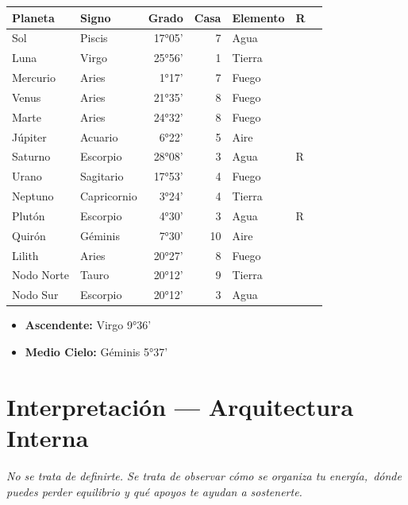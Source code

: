 \documentclass[11pt,a4paper]{article}\usepackage[utf8]{inputenc}
\begin{document}
\begin{center}
\begin{tabular}{llrrlll}
  \toprule
  \textbf{Planeta} & \textbf{Signo} & \textbf{Grado} & \textbf{Casa} &
  \textbf{Elemento} & \textbf{R} \\
  \midrule
  Sol & Piscis & 17°05' & 7 & Agua &  \\
  Luna & Virgo & 25°56' & 1 & Tierra &  \\
  Mercurio & Aries & 1°17' & 7 & Fuego &  \\
  Venus & Aries & 21°35' & 8 & Fuego &  \\
  Marte & Aries & 24°32' & 8 & Fuego &  \\
  Júpiter & Acuario & 6°22' & 5 & Aire &  \\
  Saturno & Escorpio & 28°08' & 3 & Agua & R \\
  Urano & Sagitario & 17°53' & 4 & Fuego &  \\
  Neptuno & Capricornio & 3°24' & 4 & Tierra &  \\
  Plutón & Escorpio & 4°30' & 3 & Agua & R \\
  Quirón & Géminis & 7°30' & 10 & Aire &  \\
  Lilith & Aries & 20°27' & 8 & Fuego &  \\
  Nodo Norte & Tauro & 20°12' & 9 & Tierra &  \\
  Nodo Sur & Escorpio & 20°12' & 3 & Agua &  \\
  \bottomrule
\end{tabular}
\end{center}

\vspace{0.5cm}
\begin{itemize}
  \item \textbf{Ascendente:} Virgo 9°36'
  \item \textbf{Medio Cielo:} Géminis 5°37'
\end{itemize}

\newpage

\section{Interpretación — Arquitectura Interna}

\begin{center}
{\small\itshape
No se trata de definirte. Se trata de observar cómo se organiza tu energía,\
dónde puedes perder equilibrio y qué apoyos te ayudan a sostenerte.
}
\end{center}
\end{document}
